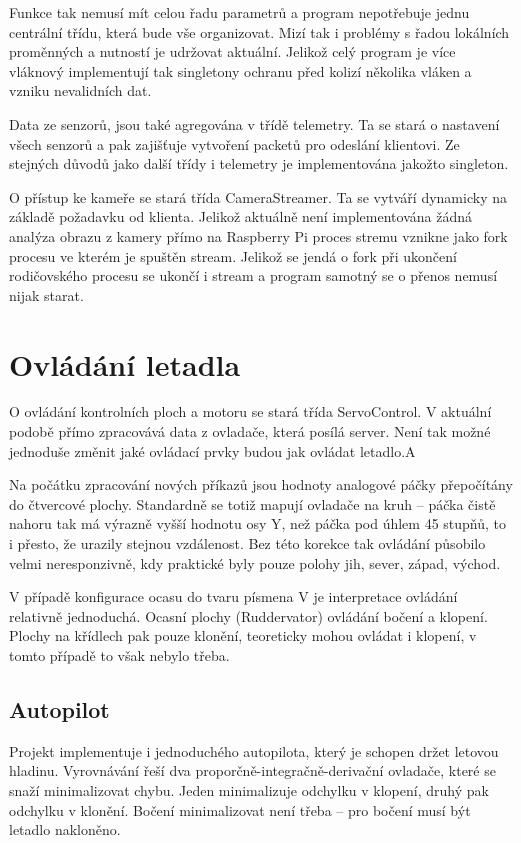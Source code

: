 \documentclass[a4paper,oneside,12pt]{report}
\begin{document}
Funkce tak nemusí mít celou řadu parametrů a program nepotřebuje jednu centrální třídu, která bude vše organizovat.
Mizí tak i problémy s řadou lokálních proměnných a nutností je udržovat aktuální.
Jelikož celý program je více vláknový implementují tak singletony ochranu před kolizí několika vláken a vzniku nevalidních dat.

Data ze senzorů, jsou také agregována v třídě telemetry.
Ta se stará o nastavení všech senzorů a pak zajišťuje vytvoření packetů pro odeslání klientovi.
Ze stejných důvodů jako další třídy i telemetry je implementována jakožto singleton.

O přístup ke kameře se stará třída CameraStreamer.
Ta se vytváří dynamicky na základě požadavku od klienta.
Jelikož aktuálně není implementována žádná analýza obrazu z kamery přímo na Raspberry Pi proces stremu vznikne jako fork procesu ve kterém je spuštěn stream.
Jelikož se jendá o fork při ukončení rodičovského procesu se ukončí i stream a program samotný se o přenos nemusí nijak starat.

\section{Ovládání letadla}

O ovládání kontrolních ploch a motoru se stará třída ServoControl.
V aktuální podobě přímo zpracovává data z ovladače, která posílá server.
Není tak možné jednoduše změnit jaké ovládací prvky budou jak ovládat letadlo.A

Na počátku zpracování nových příkazů jsou hodnoty analogové páčky přepočítány do čtvercové plochy.
Standardně se totiž mapují ovladače na kruh -- páčka čistě nahoru tak má výrazně vyšší hodnotu osy Y, než páčka pod úhlem 45 stupňů, to i přesto, že urazily stejnou vzdálenost.
Bez této korekce tak ovládání působilo velmi neresponzivně, kdy praktické byly pouze polohy jih, sever, západ, východ.

V případě konfigurace ocasu do tvaru písmena V je interpretace ovládání relativně jednoduchá.
Ocasní plochy (Ruddervator) ovládání bočení a klopení.
Plochy na křídlech pak pouze klonění, teoreticky mohou ovládat i klopení, v tomto případě to však nebylo třeba.

\subsection{Autopilot}

Projekt implementuje i jednoduchého autopilota, který je schopen držet letovou hladinu.
Vyrovnávání řeší dva proporčně-integračně-derivační ovladače, které se snaží minimalizovat chybu.
Jeden minimalizuje odchylku v klopení, druhý pak odchylku v klonění.
Bočení minimalizovat není třeba -- pro bočení musí být letadlo nakloněno.
\end{document}
